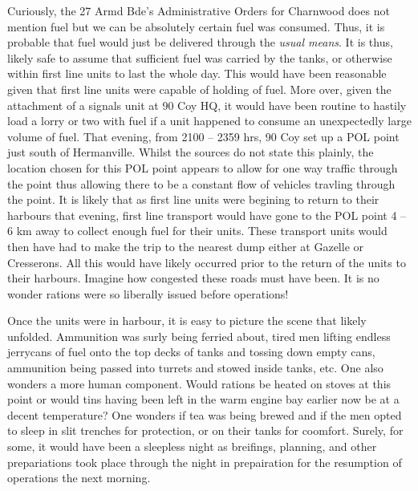 \documentclass[noraggedright]{turabian-researchpaper}
\begin{document}
Curiously, the 27 Armd Bde's Administrative Orders for Charnwood does not
mention fuel but we can be absolutely certain fuel was consumed.  Thus, it is
probable that fuel would just be delivered through the \textit{usual means}.
It is thus, likely safe to assume that sufficient fuel was
carried by the tanks, or otherwise within first line units to last the whole
day.    This would have been reasonable given that first line units were 
capable of holding %
of fuel.  More over, given the attachment of a signals unit at 90 Coy HQ, it
would have been routine to hastily load a lorry or two with fuel if a unit
happened to consume an unexpectedly large volume of fuel.
That evening, from 2100 -- 2359 hrs,
90 Coy set up a POL point just south of Hermanville.\autocite[8 July 1944]
{90wd}
Whilst the sources do not state this plainly, the location chosen for this
POL point appears to allow for one way traffic through the point thus allowing
there to be a constant flow of vehicles travling through the point.  It is 
likely that as first line units were begining to return to their harbours that 
evening, first line transport would have gone to the POL point 4 -- 6 km away 
to collect enough fuel for their units.  These transport units would then have 
had to make the trip to the nearest dump either at Gazelle or Cresserons.  All
this would have likely occurred prior to the return of the units to their 
harbours.
Imagine how congested these roads must have been.  It is no wonder rations 
were so liberally issued before operations!   

Once the units were in harbour, it is easy to picture the scene that likely
unfolded.  Ammunition was surly being ferried about, tired men lifting 
endless jerrycans of fuel onto the top decks of tanks and tossing down empty
cans, ammunition being passed into turrets and stowed inside tanks, etc. 
One also wonders a more human
component.  Would rations be heated on stoves at this point or would tins 
having been left in the warm engine bay earlier now be at a decent 
temperature?  One wonders if tea was being brewed and if the men opted to sleep
in slit trenches for protection, or on their tanks for coomfort.  Surely, for
some, it would have been a sleepless night as breifings, planning, and other
prepariations took place through the night in  prepairation for the resumption 
of operations the next morning.
\end{document}
